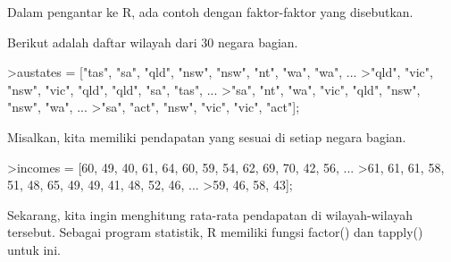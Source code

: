 \documentclass[12pt,arial,letterpaper]{book}
\begin{document}
\begin{eulercomment}
\begin{eulercomment}
\begin{eulercomment}
\begin{eulercomment}
\begin{eulercomment}
\begin{eulercomment}
\begin{eulercomment}
\begin{eulercomment}
\begin{eulercomment}
\begin{eulercomment}
\begin{eulercomment}
\begin{eulercomment}
\begin{eulercomment}
\begin{eulercomment}
\begin{eulercomment}
\begin{eulercomment}
\begin{eulercomment}
\begin{eulercomment}
\begin{eulercomment}
\begin{eulercomment}
\begin{eulercomment}
\begin{eulercomment}
\begin{eulercomment}
\begin{eulercomment}
\begin{eulercomment}
\begin{eulercomment}
\begin{eulercomment}
\begin{eulercomment}
\begin{eulercomment}
\begin{eulercomment}
\begin{eulercomment}
\begin{eulercomment}
\begin{eulercomment}
\begin{eulercomment}
\begin{eulercomment}
\begin{eulercomment}
\begin{eulercomment}
Dalam pengantar ke R, ada contoh dengan faktor-faktor yang disebutkan.

Berikut adalah daftar wilayah dari 30 negara bagian.
\end{eulercomment}
\begin{eulerprompt}
>austates = ["tas", "sa", "qld", "nsw", "nsw", "nt", "wa", "wa", ...
>"qld", "vic", "nsw", "vic", "qld", "qld", "sa", "tas", ...
>"sa", "nt", "wa", "vic", "qld", "nsw", "nsw", "wa", ...
>"sa", "act", "nsw", "vic", "vic", "act"];
\end{eulerprompt}
\begin{eulercomment}
Misalkan, kita memiliki pendapatan yang sesuai di setiap negara
bagian.
\end{eulercomment}
\begin{eulerprompt}
>incomes = [60, 49, 40, 61, 64, 60, 59, 54, 62, 69, 70, 42, 56, ...
>61, 61, 61, 58, 51, 48, 65, 49, 49, 41, 48, 52, 46, ...
>59, 46, 58, 43];
\end{eulerprompt}
\begin{eulercomment}
Sekarang, kita ingin menghitung rata-rata pendapatan di
wilayah-wilayah tersebut. Sebagai program statistik, R memiliki fungsi
factor() dan tapply() untuk ini.


\end{eulercomment}
\end{eulercomment}
\end{eulercomment}
\end{eulercomment}
\end{eulercomment}
\end{eulercomment}
\end{eulercomment}
\end{eulercomment}
\end{eulercomment}
\end{eulercomment}
\end{eulercomment}
\end{eulercomment}
\end{eulercomment}
\end{eulercomment}
\end{eulercomment}
\end{eulercomment}
\end{eulercomment}
\end{eulercomment}
\end{eulercomment}
\end{eulercomment}
\end{eulercomment}
\end{eulercomment}
\end{eulercomment}
\end{eulercomment}
\end{eulercomment}
\end{eulercomment}
\end{eulercomment}
\end{eulercomment}
\end{eulercomment}
\end{eulercomment}
\end{eulercomment}
\end{eulercomment}
\end{eulercomment}
\end{eulercomment}
\end{eulercomment}
\end{eulercomment}
\end{eulercomment}
\end{document}
